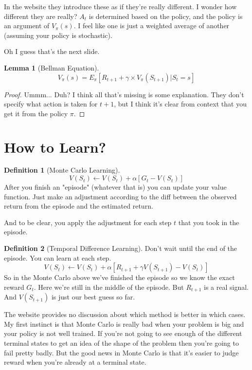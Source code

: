 \documentclass[11pt,notitlepage]{report}
\theoremstyle{definition}
\newtheorem{definition}{Definition}
\theoremstyle{plain}
\newtheorem{lemma}{Lemma}
\begin{document}
In the website they introduce these as if they're really different.
I wonder how different they are really? $A_t$ is determined based on the policy,
and the policy is an argument of $V_\pi(s)$. I feel like one is just a weighted average
of another (assuming your policy is stochastic).

Oh I guess that's the next slide.
\begin{lemma}[Bellman Equation]
    \[V_\pi(s) = E_\pi\left[R_{t+1} + \gamma \times V_\pi\left(S_{t+1}\right)\vert S_t = s\right]\]
\end{lemma}
\begin{proof}
Ummm... Duh?
I think all that's missing is some explanation.
They don't specify what action is taken for $t+1$, but I think it's clear from context
that you get it from the policy $\pi$.
\end{proof}

\section{How to Learn?}
\begin{definition}[Monte Carlo Learning]\label{monte-carlo-learning}
    \[V(S_t) \leftarrow V(S_t) + \alpha\left[G_t - V(S_t)\right]\]
    After you finish an "episode" (whatever that is) you can update your value function.
    Just make an adjustment according to the diff between the observed return from
    the episode and the estimated return.

    And to be clear, you apply the adjustment for each step $t$ that you took in the episode.
\end{definition}
\begin{definition}[Temporal Difference Learning]\label{temporal-difference-learning}
    Don't wait until the end of the episode. You can learn at each step.
    \[V(S_t) \leftarrow V(S_t) + \alpha\left[R_{t+1} + \gamma V(S_{t+1}) - V(S_t)\right]\]
    So in the Monte Carlo above we've finished the episode so we know the exact reward $G_t$.
    Here we're still in the middle of the episode. But $R_{t+1}$ is a real signal. And $V(S_{t+1})$
    is just our best guess so far.
\end{definition}

The website provides no discussion about which method is better in which cases.
My first instinct is that Monte Carlo is really bad when your problem is big and your
policy is not well trained. If you're not going to see enough of the different terminal states
to get an idea of the shape of the problem then you're going to fail pretty badly.
But the good news in Monte Carlo is that it's easier to judge reward when you're already
at a terminal state.
\end{document}
